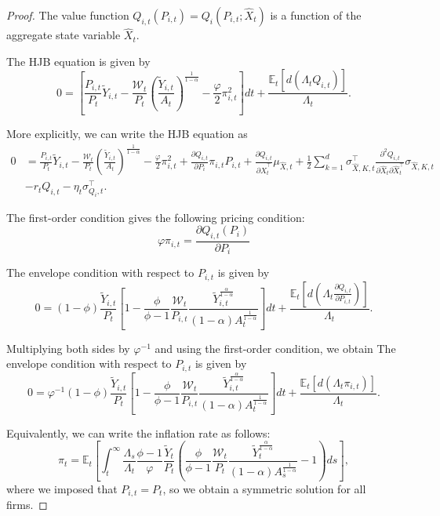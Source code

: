 \begin{proof}
The value function $Q_{i,t}(P_{i,t}) = Q_i(P_{i,t}; \hat{X}_t)$ is a function of the aggregate state variable $\hat{X}_t$.

The HJB equation is given by
\begin{equation}
    0 = \left[\frac{P_{i,t}}{P_t} \tilde{Y}_{i,t} - \frac{\mathcal{W}_{t}}{P_t} \left(\frac{\tilde{Y}_{i,t}}{A_t}\right)^{\frac{1}{1-\alpha}}  - \frac{\varphi}{2} \pi_{i,t}^2 \right] dt+ \frac{\mathbb{E}_t[d(\Lambda_t Q_{i,t})]}{\Lambda_t}.
\end{equation}

More explicitly, we can write the HJB equation as
\begin{align}
    0 &= \frac{P_{i,t}}{P_t} \tilde{Y}_{i,t} - \frac{\mathcal{W}_{t}}{P_t} \left(\frac{\tilde{Y}_{i,t}}{A_t}\right)^{\frac{1}{1-\alpha}}  - \frac{\varphi}{2} \pi_{i,t}^2+ \frac{\partial Q_{i,t}}{\partial P_{i}} \pi_{i,t} P_{i,t}  + \frac{\partial Q_{i,t}}{\partial \hat{X}_t^\top} \mu_{\hat{X},t} + \frac{1}{2}\sum_{k=1}^d  \sigma_{\hat{X},K,t}^\top \frac{\partial^2  Q_{i,t}}{\partial \hat{X}_t\partial \hat{X}_t^\top} \sigma_{\hat{X},K,t}\\
    &-r_t Q_{i,t} - \eta_t \sigma_{Q_i,t}^\top.
\end{align}

The first-order condition gives the following pricing condition:
\begin{equation}
    \varphi \pi_{i,t} = \frac{\partial Q_{i,t}(P_{i})}{\partial P_{i}} 
\end{equation}

The envelope condition with respect to $P_{i,t}$ is given by
\begin{equation}
0 = (1-\phi)\frac{\tilde{Y}_{i,t}}{P_t} \left[ 1 - \frac{\phi}{\phi-1} \frac{\mathcal{W}_{t}}{P_{i,t}} \frac{\tilde{Y}_{i,t}^{\frac{\alpha}{1-\alpha}}}{(1-\alpha) A_t^{\frac{1}{1-\alpha}}}\right] dt  + \frac{\mathbb{E}_t[d(\Lambda_t \frac{\partial Q_{i,t}}{\partial P_{i,t}})]}{\Lambda_t}.
\end{equation}

Multiplying both sides by $\varphi^{-1}$ and using the first-order condition, we obtain
The envelope condition with respect to $P_{i,t}$ is given by
\begin{equation}
0 = \varphi^{-1}(1-\phi)\frac{\tilde{Y}_{i,t}}{P_t} \left[ 1 - \frac{\phi}{\phi-1} \frac{\mathcal{W}_{t}}{P_{i,t}} \frac{\tilde{Y}_{i,t}^{\frac{\alpha}{1-\alpha}}}{(1-\alpha) A_t^{\frac{1}{1-\alpha}}}\right] dt  + \frac{\mathbb{E}_t[d(\Lambda_t \pi_{i,t})]}{\Lambda_t}.
\end{equation}

Equivalently, we can write the inflation rate as follows:
\begin{equation}
    \pi_{t} = \mathbb{E}_t\left[ \int_t^\infty \frac{\Lambda_s}{\Lambda_t} \frac{\phi-1}{\varphi}\frac{\tilde{Y}_{t}}{P_t} \left( \frac{\phi}{\phi-1} \frac{\mathcal{W}_{t}}{P_{t}} \frac{\tilde{Y}_{t}^{\frac{\alpha}{1-\alpha}}}{(1-\alpha) A_s^{\frac{1}{1-\alpha}}}-1\right) ds\right],
\end{equation}
where we imposed that $P_{i,t} = P_t$, so we obtain a symmetric solution for all firms.
\end{proof}

